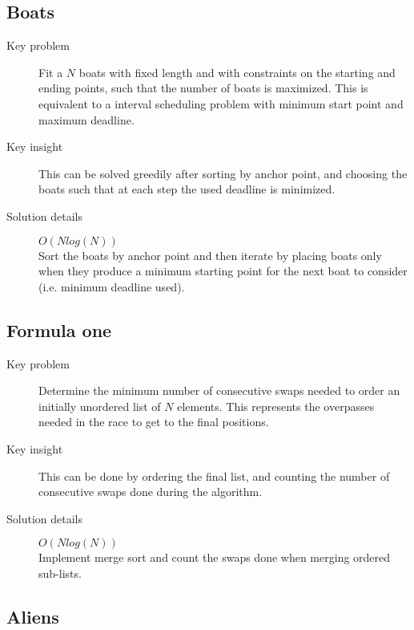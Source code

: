 \documentclass[11pt]{book}
\begin{document}
\subsection{Boats}

\begin{description}
	\item[Key problem] Fit a $N$ boats with fixed length and with constraints on the starting and ending points, such that the number of boats is maximized. This is equivalent to a interval scheduling problem with minimum start point and maximum deadline.
	\item[Key insight] This can be solved greedily after sorting by anchor point, and choosing the boats such that at each step the used deadline is minimized.
	\item[Solution details] $O(Nlog(N))$ \\ Sort the boats by anchor point and then iterate by placing boats only when they produce a minimum starting point for the next boat to consider (i.e. minimum deadline used).
\end{description}

\subsection{Formula one}

\begin{description}
	\item[Key problem] Determine the minimum number of consecutive swaps needed to order an initially unordered list of $N$ elements. This represents the overpasses needed in the race to get to the final positions.
	\item[Key insight] This can be done by ordering the final list, and counting the number of consecutive swaps done during the algorithm.
	\item[Solution details] $O(Nlog(N))$ \\ Implement merge sort and count the swaps done when merging ordered sub-lists.
\end{description}

\subsection{Aliens}
\end{document}
